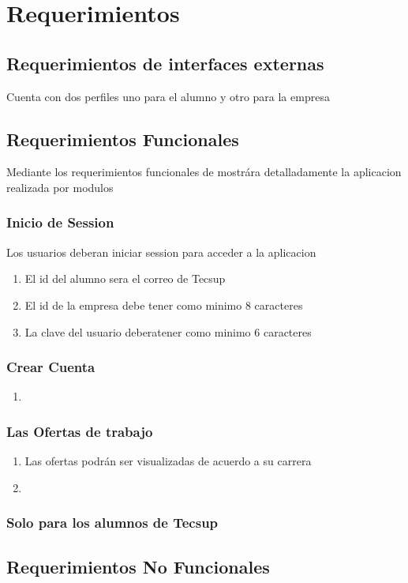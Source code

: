 \chapter{Requerimientos}

\section{Requerimientos de interfaces externas}
Cuenta con dos perfiles uno para el alumno y otro para la empresa
\subsection{}
\subsection{}
\section{Requerimientos Funcionales}
Mediante los requerimientos funcionales de mostrára detalladamente la aplicacion realizada por modulos
\subsection{Inicio de Session}
Los usuarios deberan iniciar session para acceder a la aplicacion 
\begin{enumerate}
	\item El id del alumno sera el correo de Tecsup
	\item El id de la empresa debe tener como minimo 8 caracteres
	\item La clave del usuario deberatener como minimo 6 caracteres 
	
\end{enumerate}
\subsection{Crear Cuenta}

\begin{enumerate}
	\item 
\end{enumerate}
\subsection{Las Ofertas de trabajo}
\begin{enumerate}
	\item Las ofertas podrán ser visualizadas de acuerdo a su carrera
	\item 
\end{enumerate}
\subsection{Solo para los alumnos de Tecsup}
\section{Requerimientos No Funcionales}